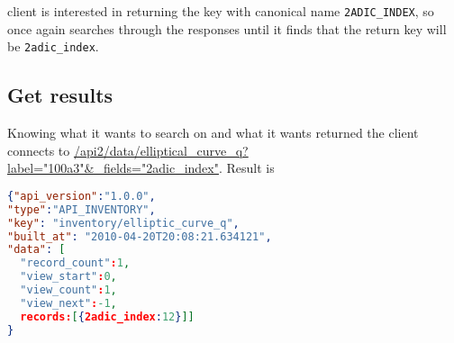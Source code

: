 \documentclass[11pt]{article}
\begin{document}
client is interested in returning the key with canonical name \texttt{2ADIC\_INDEX}, so once again searches through the responses until it finds that the return key will be \texttt{2adic\_index}.

\subsection{Get results}
Knowing what it wants to search on and what it wants returned the client connects to \url{/api2/data/elliptical_curve_q?label="100a3"&_fields="2adic\_index"}. Result is
\begin{lstlisting}[language=json,firstnumber=1]
{"api_version":"1.0.0",
"type":"API_INVENTORY",
"key": "inventory/elliptic_curve_q",
"built_at": "2010-04-20T20:08:21.634121",
"data": [
  "record_count":1,
  "view_start":0,
  "view_count":1,
  "view_next":-1,
  records:[{2adic_index:12}]]
}
\end{lstlisting}
\end{document}
